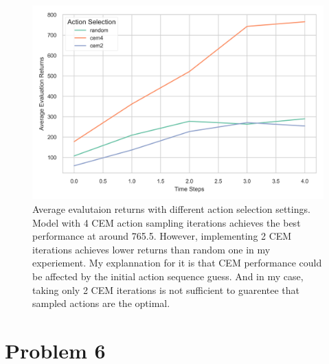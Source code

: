 \documentclass[10pt, letterpaper]{article}
\begin{document}
\begin{figure}[thbp]
    \centering
    \includegraphics[width=\textwidth]{q5.png}
    \caption{Average evalutaion returns with different action selection settings. Model with 4 CEM action sampling iterations achieves the best performance at around 765.5. However, implementing 2 CEM iterations achieves lower returns than random one in my experiement. My explannation for it is that CEM performance could be affected by the initial action sequence guess. And in my case, taking only 2 CEM iterations is not sufficient to guarentee that sampled actions are the optimal.}
\end{figure}

\pagebreak
\section*{Problem 6}
\end{document}
